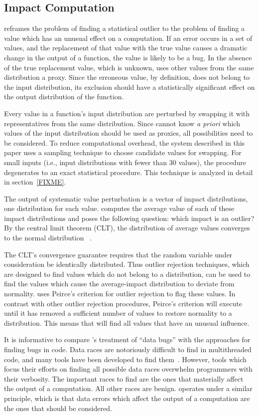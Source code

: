 \subsection{Impact Computation}

\checkcell{} reframes the problem of finding a statistical outlier to the problem of finding a value which has an unusual effect on a computation.  If an error occurs in a set of values, and the replacement of that value with the true value causes a dramatic change in the output of a function, the value is likely to be a bug.  In the absence of the true replacement value, which is unknown, \checkcell{} uses other values from the same distribution a proxy.  Since the erroneous value, by definition, does not belong to the input distribution, its exclusion should have a statistically significant effect on the output distribution of the function.

Every value in a function's input distribution are perturbed by swapping it with representatives from the same distribution.  Since \checkcell{} cannot know \emph{a priori} which values of the input distribution should be used as proxies, all possibilities need to be considered.  To reduce computational overhead, the system described in this paper uses a sampling technique to choose candidate values for swapping.  For small inputs (i.e., input distributions with fewer than 30 values), the procedure degenerates to an exact statistical procedure.  This technique is analyzed in detail in section~\ref{FIXME}.

The output of systematic value perturbation is a vector of impact distributions, one distribution for each value.  \checkcell{} computes the average value of each of these impact distributions and poses the following question: which impact is an outlier?  By the central limit theorem (CLT), the distribution of average values converges to the normal distribution ~\cite{FIXME}.

The CLT's convergence guarantee requires that the random variable under consideration be identically distributed.  Thus outlier rejection techniques, which are designed to find values which do not belong to a distribution, can be used to find the values which cause the average-impact distribution to deviate from normality.  \checkcell{} uses Peirce's criterion for outlier rejection to flag these values.  In contrast with other outlier rejection procedures, Peirce's criterion will execute until it has removed a sufficient number of values to restore normality to a distribution.  This means that \checkcell{} will find all values that have an unusual influence.

It is informative to compare \checkcell{}'s treatment of ``data bugs'' with the approaches for finding bugs in code.  Data races are notoriously difficult to find in multithreaded code, and many tools have been developed to find them~\cite{FIXME}.  However, tools which focus their efforts on finding all possible data races overwhelm programmers with their verbosity.  The important races to find are the ones that materially affect the output of a computation.  All other races are benign.  \checkcell{} operates under a similar principle, which is that data errors which affect the output of a computation are the ones that should be considered.

